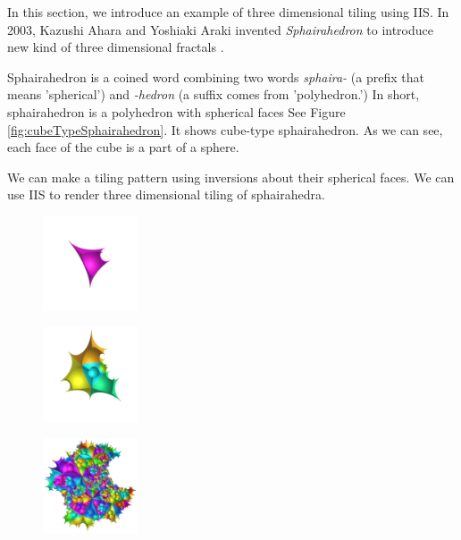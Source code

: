 In this section, we introduce an example of three dimensional
tiling using IIS.
In 2003, Kazushi Ahara and Yoshiaki Araki invented
\textit{Sphairahedron} to introduce new kind of three dimensional
fractals \cite{ahara2003sphairahedral}.

Sphairahedron is a coined word combining two words \textit{sphaira-}
(a prefix that means 'spherical') and \textit{-hedron} (a suffix comes
from 'polyhedron.')
In short, sphairahedron is a polyhedron with spherical faces
See Figure \ref{fig:cubeTypeSphairahedron}.
It shows cube-type sphairahedron. 
As we can see, each face of the cube is a part of a sphere.

We can make a tiling pattern using inversions about their spherical
faces.
We can use IIS to render three dimensional tiling of sphairahedra.

\begin{figure}[H]
 \begin{minipage}[t]{0.19\textwidth}
  \centering
  \includegraphics[width=1.1in, height=1.1in, keepaspectratio]{./img/application/sphairahedron/finiteProcess/step1.png}
  \label{fig:sphaira-step1}
 \end{minipage}
 \hspace*{\fill}
 \begin{minipage}[t]{0.19\textwidth}
  \centering
  \includegraphics[width=1.1in, height=1.1in, keepaspectratio]{./img/application/sphairahedron/finiteProcess/step2.png}
  \label{fig:sphaira-step2}
 \end{minipage}
 \hspace*{\fill}
 \begin{minipage}[t]{0.19\textwidth}
  \centering
  \includegraphics[width=1.1in, height=1.1in, keepaspectratio]{./img/application/sphairahedron/finiteProcess/step5.png}

\end{minipage}
\end{figure}
